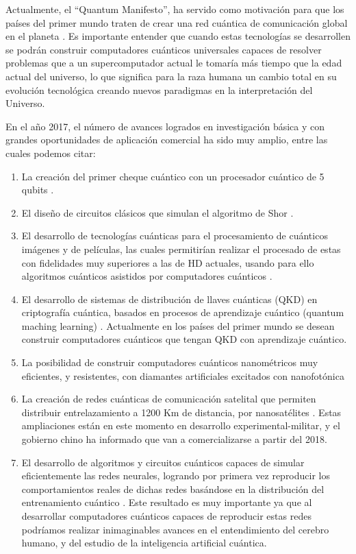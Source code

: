 Actualmente, el “Quantum Manifesto”, ha servido como motivación para que los países del primer mundo traten de crear una red cuántica de comunicación global en el planeta \cite{Simon_2017}. Es importante entender que cuando estas tecnologías se desarrollen se podrán construir computadores cuánticos universales capaces de resolver problemas que a un supercomputador actual le tomaría más tiempo que la edad actual del universo, lo que significa para la raza humana un cambio total en su evolución tecnológica creando nuevos paradigmas en la interpretación del Universo.

En el año 2017, el número de avances logrados en investigación básica y con grandes oportunidades de aplicación comercial ha sido muy amplio, entre las cuales podemos citar:

\begin{enumerate}
    \item La creación del primer cheque cuántico con un procesador cuántico de 5 qubits \cite{Behera_2017}.
    \item El diseño de circuitos clásicos que simulan el algoritmo de Shor \cite{Johansson_2017}.
    \item El desarrollo de tecnologías cuánticas para el procesamiento de cuánticos imágenes y de películas, las cuales permitirían realizar el procesado de estas con fidelidades muy superiores a las de HD actuales, usando para ello algoritmos cuánticos asistidos por computadores cuánticos \cite{Yan_2017}.
    \item El desarrollo de sistemas de distribución de llaves cuánticas (QKD) en criptografía cuántica, basados en procesos de aprendizaje cuántico (quantum maching learning) \cite{Sheng_2017}. Actualmente en los países del primer mundo se desean construir computadores cuánticos que tengan QKD con aprendizaje cuántico.
    \item La posibilidad de construir computadores cuánticos nanométricos muy eficientes, y resistentes, con diamantes artificiales excitados con nanofotónica \cite{Zhang_2017}
    \item La creación de redes cuánticas de comunicación satelital que permiten distribuir entrelazamiento a 1200 Km de distancia, por nanosatélites \cite{Deng_2017}. Estas ampliaciones están en este momento en desarrollo experimental-militar, y el gobierno chino ha informado que van a comercializarse a partir del 2018.
    \item El desarrollo de algoritmos y circuitos cuánticos capaces de simular eficientemente las redes neurales, logrando por primera vez reproducir los comportamientos reales de dichas redes basándose en la distribución del entrenamiento cuántico \cite{Chen_2017}. Este resultado es muy importante ya que al desarrollar computadores cuánticos capaces de reproducir estas redes podríamos realizar inimaginables avances en el entendimiento del cerebro humano, y del estudio de la inteligencia artificial cuántica.
\end{enumerate}

